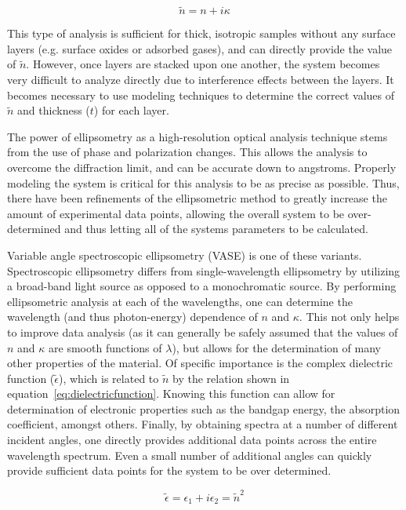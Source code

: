 \begin{equation}
 \label{eq:complexindex}
 \displaystyle
	\tilde{n} = n + i\kappa
\end{equation}

This type of analysis is sufficient for thick, isotropic samples without any surface layers (e.g. surface oxides or adsorbed gases), and can directly provide the value of $\tilde{n}$. However, once layers are stacked upon one another, the system becomes very difficult to analyze directly due to interference effects between the layers. It becomes necessary to use modeling techniques to determine the correct values of $\tilde{n}$ and thickness ($t$) for each layer. 

The power of ellipsometry as a high-resolution optical analysis technique stems from the use of phase and polarization changes. This allows the analysis to overcome the diffraction limit, and can be accurate down to angstroms. Properly modeling the system is critical for this analysis to be as precise as possible. Thus, there have been refinements of the ellipsometric method to greatly increase the amount of experimental data points, allowing the overall system to be over-determined and thus letting all of the systems parameters to be calculated. 
	
Variable angle spectroscopic ellipsometry (VASE) is one of these variants. Spectroscopic ellipsometry differs from single-wavelength ellipsometry by utilizing a broad-band light source as opposed to a monochromatic source. By performing ellipsometric analysis at each of the wavelengths, one can determine the wavelength (and thus photon-energy) dependence of $n$ and $\kappa$. This not only helps to improve data analysis (as it can generally be safely assumed that the values of $n$ and $\kappa$ are smooth functions of $\lambda$), but allows for the determination of many other properties of the material. Of specific importance is the complex dielectric function ($\tilde{\epsilon}$), which is related to $\tilde{n}$ by the relation shown in equation~\ref{eq:dielectricfunction}. Knowing this function can allow for determination of electronic properties such as the bandgap energy, the absorption coefficient, amongst others. Finally, by obtaining spectra at a number of different incident angles, one directly provides additional data points across the entire wavelength spectrum. Even a small number of additional angles can quickly provide sufficient data points for the system to be over determined. 

\begin{equation}
 \label{eq:dielectricfunction}
 \displaystyle
	\tilde{\epsilon} = \epsilon_{1} + i\epsilon_{2} = \tilde{n}^{2}
\end{equation}

